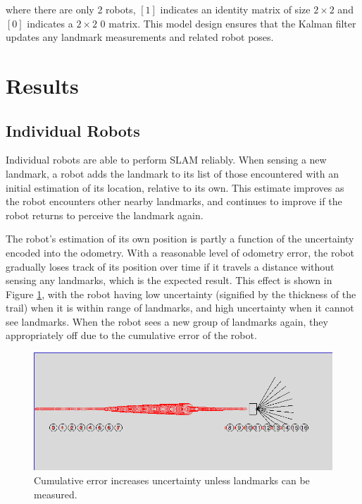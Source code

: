 \documentclass[prodmode,acmtecs]{acmsmall} %
\begin{document}
where there are only 2 robots, $[1]$ indicates an identity matrix of size $2\times 2$ and $[0]$ indicates a $2\times 2$ 0 matrix. This model design ensures that the Kalman filter updates any landmark measurements and related robot poses.

\section{Results}

\subsection{Individual Robots}

Individual robots are able to perform SLAM reliably.  When sensing a new landmark, a robot adds the landmark to its list of those encountered with an initial estimation of its location, relative to its own.  This estimate improves as the robot encounters other nearby landmarks, and continues to improve if the robot returns to perceive the landmark again.

The robot's estimation of its own position is partly a function of the uncertainty encoded into the odometry.  With a reasonable level of odometry error, the robot gradually loses track of its position over time if it travels a distance without sensing any landmarks, which is the expected result. This effect is shown in Figure \ref{fig:waypoints}, with the robot having low uncertainty (signified by the thickness of the trail) when it is within range of landmarks, and high uncertainty when it cannot see landmarks. When the robot sees a new group of landmarks again, they appropriately off due to the cumulative error of the robot.

\begin{figure}[h!]
\includegraphics[width=\textwidth]{waypoints.png}
\caption{Cumulative error increases uncertainty unless landmarks can be measured.}
\label{fig:waypoints}
\end{figure}
\end{document}
